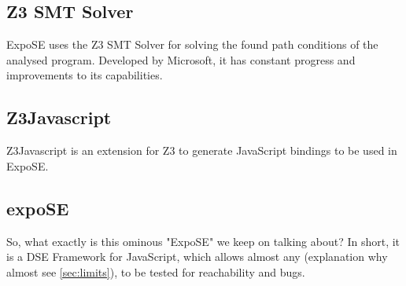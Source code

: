 \subsection{Z3 SMT Solver}
\label{sec:z3}


ExpoSE uses the Z3 SMT Solver for solving the found path conditions of the analysed program. Developed by Microsoft, it has constant progress and improvements to its capabilities. 



\subsection{Z3Javascript}
\label{sec:z3js}

Z3Javascript is an extension for Z3 to generate JavaScript bindings to be used in ExpoSE.


\subsection{expoSE}
\label{sec:expose}
So, what exactly is this ominous "ExpoSE" we keep on talking about? 
In short, it is a DSE Framework for JavaScript, which allows almost any (explanation why almost see \autoref{sec:limits}), to be tested for reachability and bugs.

